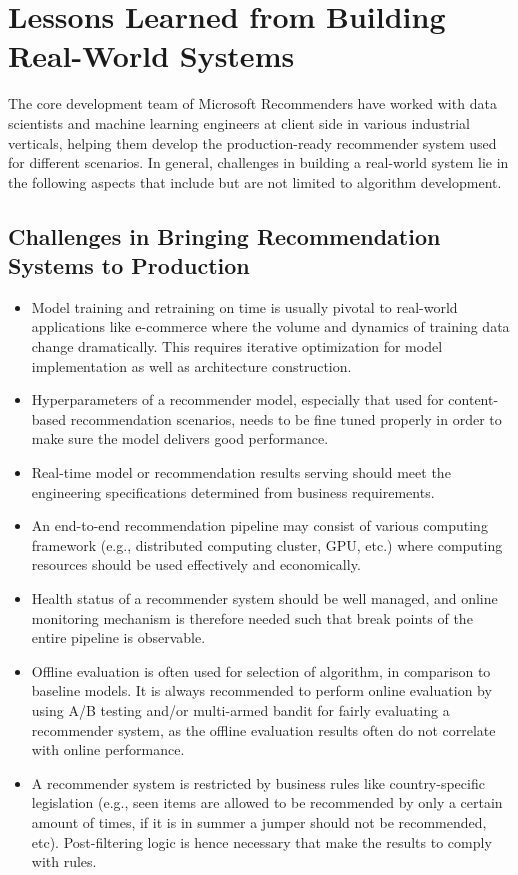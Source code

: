 \section{Lessons Learned from Building Real-World Systems} 

The core development team of Microsoft Recommenders have worked with data scientists and machine learning engineers at client side in various industrial verticals, helping them develop the production-ready recommender system used for different scenarios. In general, challenges in building a real-world system lie in the following aspects that include but are not limited to algorithm development.

\subsection{Challenges in Bringing Recommendation Systems to Production}

\begin{itemize}
    \item Model training and retraining on time is usually pivotal to real-world applications like e-commerce where the volume and dynamics of training data change dramatically. This requires iterative optimization for model implementation as well as architecture construction.
    \item Hyperparameters of a recommender model, especially that used for content-based recommendation scenarios, needs to be fine tuned properly in order to make sure the model delivers good performance. 
    \item Real-time model or recommendation results serving should meet the engineering specifications determined from business requirements. 
    \item An end-to-end recommendation pipeline may consist of various computing framework (e.g., distributed computing cluster, GPU, etc.) where computing resources should be used effectively and economically. 
    \item Health status of a recommender system should be well managed, and online monitoring mechanism is therefore needed such that break points of the entire pipeline is observable.
    \item Offline evaluation is often used for selection of algorithm, in comparison to baseline models. It is always recommended to perform online evaluation by using A/B testing and/or multi-armed bandit for fairly evaluating a recommender system, as the offline evaluation results often do not correlate with online performance.
    \item A recommender system is restricted by business rules like country-specific legislation (e.g., seen items are allowed to be recommended by only a certain amount of times, if it is in summer a jumper should not be recommended, etc). Post-filtering logic is hence necessary that make the results to comply with rules.
\end{itemize}

